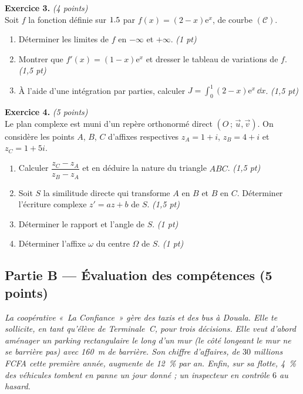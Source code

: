 \smallskip
\noindent\textbf{Exercice 3.} \hfill\textit{(4 points)}\\
Soit $f$ la fonction définie sur $1.5$ par $f(x)=(2-x)\mathrm{e}^{x}$, de courbe $(\mathcal{C})$.
\begin{enumerate}[label=\arabic*)]
\item Déterminer les limites de $f$ en $-\infty$ et $+\infty$. \hfill\textit{(1 pt)}
\item Montrer que $f'(x)=(1-x)\mathrm{e}^{x}$ et dresser le tableau de variations de $f$. \hfill\textit{(1,5 pt)}
\item À l'aide d'une intégration par parties, calculer $\displaystyle J=\int_0^{1}(2-x)\mathrm{e}^{x}\,\dd x$. \hfill\textit{(1,5 pt)}
\end{enumerate}

\smallskip
\noindent\textbf{Exercice 4.} \hfill\textit{(5 points)}\\
Le plan complexe est muni d'un repère orthonormé direct $(O\,;\,\vec u,\vec v)$. On considère
les points $A$, $B$, $C$ d'affixes respectives $z_A=1+i$, $z_B=4+i$ et $z_C=1+5i$.
\begin{enumerate}[label=\arabic*)]
\item Calculer $\dfrac{z_C-z_A}{z_B-z_A}$ et en déduire la nature du triangle $ABC$. \hfill\textit{(1,5 pt)}
\item Soit $S$ la similitude directe qui transforme $A$ en $B$ et $B$ en $C$.
Déterminer l'écriture complexe $z'=az+b$ de $S$. \hfill\textit{(1,5 pt)}
\item Déterminer le rapport et l'angle de $S$. \hfill\textit{(1 pt)}
\item Déterminer l'affixe $\omega$ du centre $\Omega$ de $S$. \hfill\textit{(1 pt)}
\end{enumerate}

\subsection*{Partie B — Évaluation des compétences \hfill (5 points)}

\noindent\textit{La coopérative «~La Confiance~» gère des taxis et des bus à Douala. Elle te
sollicite, en tant qu'élève de Terminale~C, pour trois décisions. Elle veut d'abord aménager
un parking rectangulaire \emph{le long d'un mur} (le côté longeant le mur ne se barrière pas)
avec \SI{160}{\metre} de barrière. Son chiffre d'affaires, de $30$ millions FCFA cette première
année, augmente de \SI{12}{\percent} par an. Enfin, sur sa flotte, \SI{4}{\percent} des véhicules
tombent en panne un jour donné ; un inspecteur en contrôle $6$ au hasard.}

